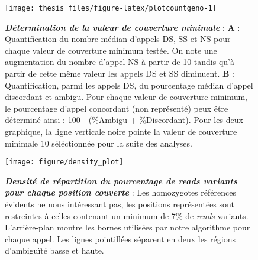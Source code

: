 \documentclass[12pt,a4paper,twoside]{ugathesis}
\begin{document}
\newpage

\begin{figure}

{\centering \texttt{[image: thesis\_files/figure-latex/plotcountgeno-1]} 

}

\caption[Détermination de la valeur de couverture
minimale\\]{\textbf{\emph{Détermination de la valeur de
couverture minimale}} : \textbf{A} : Quantification du nombre médian
d'appels DS, SS et NS pour chaque valeur de couverture minimum testée.
On note une augmentation du nombre d'appel NS à partir de 10 tandis qu'à
partir de cette même valeur les appels DS et SS diminuent. \textbf{B} :
Quantification, parmi les appels DS, du pourcentage médian d'appel
discordant et ambigu. Pour chaque valeur de couverture minimum, le
pourcentage d'appel concordant (non représenté) peux être déterminé
ainsi : 100 - (\%Ambigu + \%Discordant). Pour les deux graphique, la
ligne verticale noire pointe la valeur de couverture minimale 10
séléctionnée pour la suite des analyses.}\label{fig:plotcountgeno}
\end{figure}















\newpage

\begin{figure}

{\centering \texttt{[image: figure/density\_plot]} 

}

\caption[Densité de répartition du pourcentage de
\emph{reads} variants pour chaque position couverte\\]{\textbf{\emph{Densité de répartition du pourcentage
de \emph{reads} variants pour chaque position couverte}} : Les
homozygotes références évidents ne nous intéressant pas, les positions
représentées sont restreintes à celles contenant un minimum de 7\% de
\emph{reads} variants. L'arrière-plan montre les bornes utilisées par
notre algorithme pour chaque appel. Les lignes pointillées séparent en
deux les régions d'ambiguïté basse et haute.}\label{fig:plotdensityvar}
\end{figure}
\end{document}
